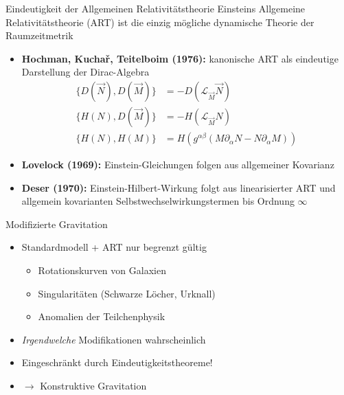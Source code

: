 \documentclass{beamer}
\begin{document}
    \begin{frame}{Eindeutigkeit der Allgemeinen Relativitätstheorie}
        Einsteins Allgemeine Relativitätstheorie (ART) ist die einzig mögliche dynamische Theorie
        der Raumzeitmetrik \pause
        \begin{itemize}
            \setlength{\belowdisplayskip}{-10pt}
            \item \textbf{Hochman, Kuchař, Teitelboim (1976):} kanonische ART
            als eindeutige Darstellung der Dirac-Algebra
            \begin{align*}
                \{ D(\vec N), D(\vec M) \} &= -D(\mathcal L_{\vec M} \vec N) \\
                \{ H(N), D(\vec M) \} &= -H(\mathcal L_{\vec M} N) \\
                \{ H(N), H(M) \} &= H(g^{\alpha\beta}(M\partial_\alpha N - N\partial_\alpha M))
            \end{align*} \pause
            \item \textbf{Lovelock (1969):} Einstein-Gleichungen folgen aus allgemeiner Kovarianz \pause
            \item \textbf{Deser (1970):} Einstein-Hilbert-Wirkung folgt aus linearisierter ART und allgemein kovarianten
            Selbstwechselwirkungstermen bis Ordnung $\infty$
        \end{itemize}
    \end{frame}

    \begin{frame}{Modifizierte Gravitation}
        \begin{itemize}
            \item Standardmodell + ART nur begrenzt gültig
            \begin{itemize}
                \item Rotationskurven von Galaxien
                \item Singularitäten (Schwarze Löcher, Urknall)
                \item Anomalien der Teilchenphysik
            \end{itemize}
            \item \emph{Irgendwelche} Modifikationen wahrscheinlich
            \item Eingeschränkt durch Eindeutigkeitstheoreme!
            \item \alert{$\rightarrow$ Konstruktive Gravitation}
        \end{itemize}
    \end{frame}
\end{document}

